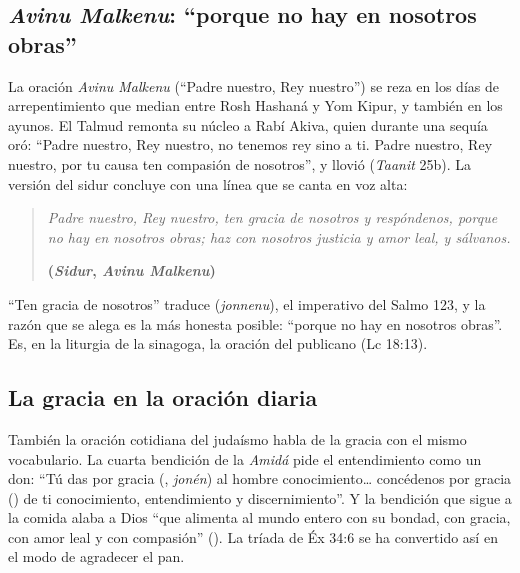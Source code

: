 \subsection{\emph{Avinu Malkenu}: “porque no hay en nosotros obras”}
La oración \emph{Avinu Malkenu} (``Padre nuestro, Rey nuestro'') se reza en los días de arrepentimiento que median entre Rosh Hashaná y Yom Kipur, y también en los ayunos. El Talmud remonta su núcleo a Rabí Akiva, quien durante una sequía oró: ``Padre nuestro, Rey nuestro, no tenemos rey sino a ti. Padre nuestro, Rey nuestro, por tu causa ten compasión de nosotros'', y llovió (\emph{Taanit} 25b). La versión del sidur concluye con una línea que se canta en voz alta:

\begin{quote}\itshape
Padre nuestro, Rey nuestro, ten gracia de nosotros y respóndenos, porque no hay en nosotros obras; haz con nosotros justicia y amor leal, y sálvanos.\par\hfill{\upshape\small\bfseries\textcolor{azulp}{(\emph{Sidur}, \emph{Avinu Malkenu})}}
\end{quote}

``Ten gracia de nosotros'' traduce  (\emph{jonnenu}), el imperativo del Salmo 123, y la razón que se alega es la más honesta posible: ``porque no hay en nosotros obras''. Es, en la liturgia de la sinagoga, la oración del publicano (Lc 18:13).


\subsection{La gracia en la oración diaria}
También la oración cotidiana del judaísmo habla de la gracia con el mismo vocabulario. La cuarta bendición de la \emph{Amidá} pide el entendimiento como un don: ``Tú das por gracia (, \emph{jonén}) al hombre conocimiento\ldots{} concédenos por gracia () de ti conocimiento, entendimiento y discernimiento''. Y la bendición que sigue a la comida alaba a Dios ``que alimenta al mundo entero con su bondad, con gracia, con amor leal y con compasión'' (). La tríada de Éx 34:6 se ha convertido así en el modo de agradecer el pan.

